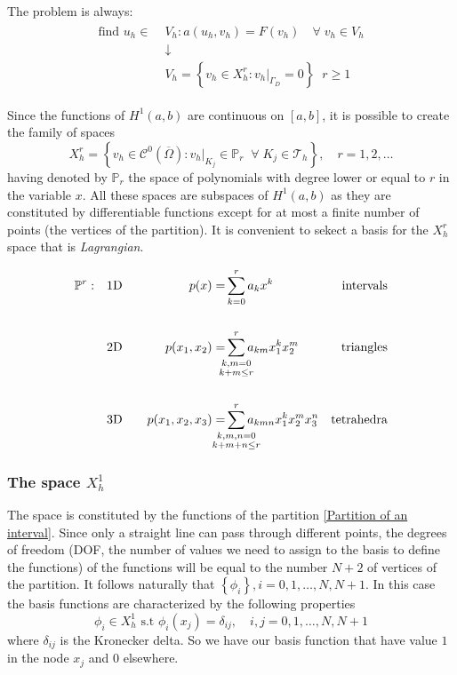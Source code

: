 The problem is always: 
\begin{align}
    \begin{split} 
        \text{find } u_h \in \;&V_h : a(u_h, v_h) = F(v_h) \quad \forall \; v_h \in V_h \\
        &\downarrow\\
        &V_h = \left\lbrace v_h \in X^r_h : v_h\vert_{\Gamma_D} = 0\right\rbrace \; \; r \geq 1 \label{Galerkin weak formulation}
    \end{split}   
\end{align}

Since the functions of \(H^1(a,b)\) are continuous on \([a,b]\), it is possible to create the family of spaces 
\begin{equation}
    X_h^r = \left\{v_h \in \mathcal{C}^0\left(\overline{\Omega}\right) : v_h \vert_{K_j} \in \mathbb{P}_r \;\; \forall \; K_j \in \mathcal{T}_h\right\}, \quad r= 1,2,\ldots \label{Family of spaces FEM}
\end{equation}
having denoted by \(\mathbb{P}_r\) the space of polynomials with degree lower or equal to \(r\) in the variable \(x\). All these spaces are subspaces of \(H^1(a,b)\) as they are constituted by differentiable functions except for at most a finite number of points (the vertices of the partition). It is convenient to sekect a basis for the \(X^r_h\) space that is \textit{Lagrangian}.

    \begin{align*}
        \mathbb{P}^r:\quad &\text{1D} \quad &p(x) =& \sum_{k=0}^r a_k x^k &\text{intervals} \\
        \\
                      &\text{2D}  \quad &p(x_1, x_2) =& \sum_{\mathclap{\substack{k,m=0 \\ k + m \leq r}}}^r a_{km} x_1^k x_2^m  &\text{triangles} \\
         \\
                      &\text{3D} \quad &p(x_1, x_2, x_3) =& \sum_{\mathclap{\substack{k,m,n=0 \\ k + m + n  \leq r}}}^r a_{kmn} x_1^k x_2^m x_3^n &\text{tetrahedra}
    \end{align*}

\subsubsection*{The space \(X^1_h\)}
The space is constituted by the functions of the partition \eqref{Partition of an interval}. Since only a straight line can pass through different points, the degrees of freedom (DOF, the number of values we need to assign to the basis to define the functions)  of the functions will be equal to the number \(N+2\) of vertices of the partition. It follows naturally that \(\left\lbrace\phi_i\right\rbrace, i = 0, 1, \ldots, N, N+1\).
In this case the basis functions are characterized by the following properties 
\[
    \phi_i \in X^1_h \text{ s.t } \phi_i(x_j) = \delta_{ij}, \quad i, j = 0, 1, \ldots, N, N+1
\]
where \(\delta_{ij}\) is the Kronecker delta. So we have our basis function that have value \(1\) in the node \(x_j\) and \(0\) elsewhere.


